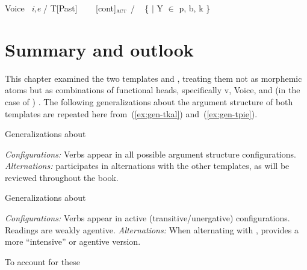 \begin{exe}
\begin{xlist}
\begin{exe}
\begin{xlist}
\begin{exe}
\begin{xlist}
\begin{exe}
\begin{exe}
\begin{xlist}
\begin{exe}
\begin{xlist}
\begin{exe}
\begin{xlist}
\begin{exe}
\begin{xlist}
\begin{exe}
\begin{xlist}
\begin{exe}
\begin{xlist}
\begin{exe}
\begin{xlist}
\begin{exe}
\begin{xlist}
\begin{exe}
\begin{xlist}
\begin{exe}
\begin{xlist}
\begin{exe}
\begin{xlist}
\begin{exe}
\begin{xlist}
\begin{exe}
\begin{xlist}
\begin{exe}
\begin{exe}
\begin{xlist}
\begin{exe}
\begin{xlist}
\begin{exe}
\begin{xlist}
\begin{exe}
\begin{xlist}
\begin{exe}
\begin{xlist}
\begin{exe}
\begin{xlist}
\begin{exe}
\begin{xlist}
\begin{exe}
\begin{xlist}
\begin{xlist}
\begin{xlist}
\begin{exe}
\begin{xlist}
\begin{xlist}
\begin{xlist}
\begin{exe}
\begin{exe}
\begin{xlist}
\begin{exe}
\begin{xlist}
\begin{exe}
\begin{xlist}
\begin{exe}
\begin{xlist}
\begin{exe}
\begin{xlist}
\begin{exe}
\begin{xlist}
\begin{exe}
\begin{xlist}
\begin{exe}
\begin{exe}
\begin{xlist}
\begin{xlist}
\begin{exe}
\begin{xlist}
\begin{exe}
\begin{xlist}
\begin{exe}
\begin{xlist}
\begin{exe}
\begin{xlist}
\begin{exe}
\begin{xlist}
\begin{exe}
\begin{xlist}
\begin{exe}
\begin{exe}
\begin{xlist}
\begin{exe}
\begin{xlist}
\begin{exe}
\begin{xlist}
\begin{exe}
\begin{xlist}
\begin{exe}
\begin{xlist}
\begin{exe}
\begin{xlist}
\begin{exe}
\begin{xlist}
\begin{exe}
\begin{xlist}
\begin{exe}
 \ex  \label{ex:2n67}
 \begin{xlist} 
 	\ex  \label{vi:voice2}	Voice \lra~\emph{i,e} / T[Past] \trace~\va 
	\ex  \label{vi:va}\va~\lra~[\textminus{}cont]$_{\gsc{ACT}}$ / \trace~ \{  $|$ Y $\in$ p, b, k \} 
			
 \z
\z 

\section{Summary and outlook} \label{voice:conc}
This chapter examined the two templates {\tkal} and {\tpie}, treating them not as morphemic atoms but as combinations of functional heads, specifically v, Voice, and (in the case of {\tpie}) {\va}. The following generalizations about the argument structure of both templates are repeated here from~(\ref{ex:gen-tkal}) and~(\ref{ex:gen-tpie}).

 \begin{exe}
 \ex  \label{ex:gen-tkal2}Generalizations about {\tkal}
 \begin{xlist} 
 	\ex  \textit{Configurations:} Verbs appear in all possible argument structure configurations. 
 	\ex  \textit{Alternations:} {\tkal} participates in alternations with the other templates, as will be reviewed throughout the book. 
 \z

 \ex  \label{ex:gen-tpie2}Generalizations about {\tpie}
 \begin{xlist} 
 	\ex \textit{Configurations:} Verbs appear in active (transitive/unergative) configurations. 
		Readings are weakly agentive.
 	\ex  \textit{Alternations:} When alternating with {\tkal}, {\tpie} provides a more ``intensive'' or agentive version. 
 \z
\z 

To account for these 
\end{xlist}
\end{xlist}
\end{exe}
\end{xlist}
\end{exe}
\end{xlist}
\end{exe}
\end{xlist}
\end{exe}
\end{xlist}
\end{exe}
\end{xlist}
\end{exe}
\end{xlist}
\end{exe}
\end{xlist}
\end{exe}
\end{xlist}
\end{exe}
\end{xlist}
\end{exe}
\end{exe}
\end{xlist}
\end{exe}
\end{xlist}
\end{exe}
\end{xlist}
\end{exe}
\end{xlist}
\end{exe}
\end{xlist}
\end{exe}
\end{xlist}
\end{exe}
\end{xlist}
\end{xlist}
\end{exe}
\end{exe}
\end{xlist}
\end{exe}
\end{xlist}
\end{exe}
\end{xlist}
\end{exe}
\end{xlist}
\end{exe}
\end{xlist}
\end{exe}
\end{xlist}
\end{exe}
\end{xlist}
\end{exe}
\end{exe}
\end{xlist}
\end{xlist}
\end{xlist}
\end{exe}
\end{xlist}
\end{xlist}
\end{xlist}
\end{exe}
\end{xlist}
\end{exe}
\end{xlist}
\end{exe}
\end{xlist}
\end{exe}
\end{xlist}
\end{exe}
\end{xlist}
\end{exe}
\end{xlist}
\end{exe}
\end{xlist}
\end{exe}
\end{exe}
\end{xlist}
\end{exe}
\end{xlist}
\end{exe}
\end{xlist}
\end{exe}
\end{xlist}
\end{exe}
\end{xlist}
\end{exe}
\end{xlist}
\end{exe}
\end{xlist}
\end{exe}
\end{xlist}
\end{exe}
\end{xlist}
\end{exe}
\end{xlist}
\end{exe}
\end{xlist}
\end{exe}
\end{xlist}
\end{exe}
\end{xlist}
\end{exe}
\end{exe}
\end{xlist}
\end{exe}
\end{xlist}
\end{exe}
\end{xlist}
\end{exe}

